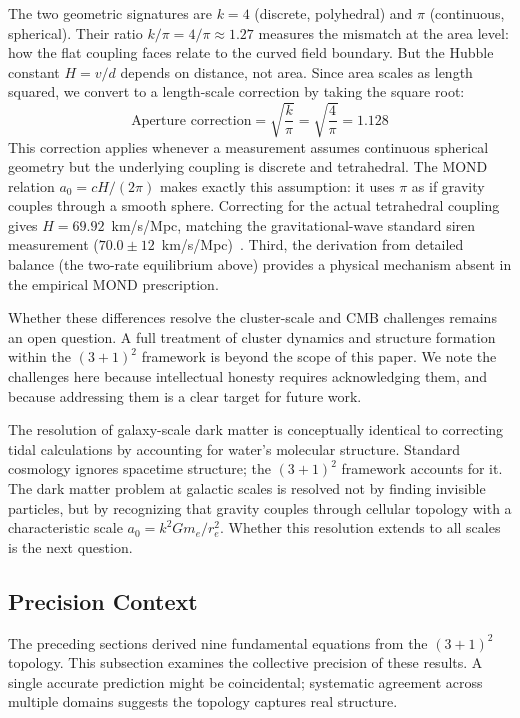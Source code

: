 \documentclass[aps,prd,preprint,superscriptaddress,showpacs,preprintnumbers,amsmath,amssymb,nofootinbib]{revtex4-2}
\begin{document}
The two geometric signatures are $k = 4$ (discrete, polyhedral) and $\pi$ (continuous, spherical). Their ratio $k/\pi = 4/\pi \approx 1.27$ measures the mismatch at the area level: how the flat coupling faces relate to the curved field boundary. But the Hubble constant $H = v/d$ depends on distance, not area. Since area scales as length squared, we convert to a length-scale correction by taking the square root:
\begin{equation}
\text{Aperture correction} = \sqrt{\frac{k}{\pi}} = \sqrt{\frac{4}{\pi}} = 1.128
\end{equation}
This correction applies whenever a measurement assumes continuous spherical geometry but the underlying coupling is discrete and tetrahedral. The MOND relation $a_0 = cH/(2\pi)$ makes exactly this assumption: it uses $\pi$ as if gravity couples through a smooth sphere. Correcting for the actual tetrahedral coupling gives $H = 69.92$~km/s/Mpc, matching the gravitational-wave standard siren measurement ($70.0 \pm 12$~km/s/Mpc)~\cite{gw170817}. Third, the derivation from detailed balance (the two-rate equilibrium above) provides a physical mechanism absent in the empirical MOND prescription.

Whether these differences resolve the cluster-scale and CMB challenges remains an open question. A full treatment of cluster dynamics and structure formation within the $(3+1)^2$ framework is beyond the scope of this paper. We note the challenges here because intellectual honesty requires acknowledging them, and because addressing them is a clear target for future work.

The resolution of galaxy-scale dark matter is conceptually identical to correcting tidal calculations by accounting for water's molecular structure. Standard cosmology ignores spacetime structure; the $(3+1)^2$ framework accounts for it. The dark matter problem at galactic scales is resolved not by finding invisible particles, but by recognizing that gravity couples through cellular topology with a characteristic scale $a_0 = k^2 G m_e / r_e^2$. Whether this resolution extends to all scales is the next question.

\subsection{Precision Context}
\label{subsec:precision}

The preceding sections derived nine fundamental equations from the $(3+1)^2$ topology. This subsection examines the collective precision of these results. A single accurate prediction might be coincidental; systematic agreement across multiple domains suggests the topology captures real structure.
\end{document}
